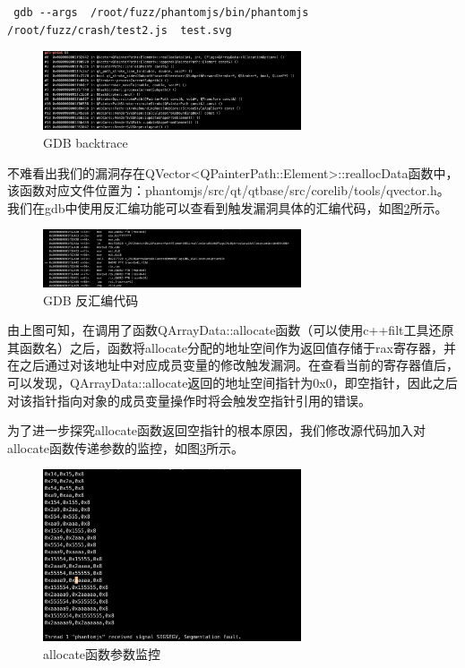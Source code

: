 \documentclass[doctor,privacy,twoside]{buaa_mac}
\begin{document}
\lstset{language=JavaScript}
\begin{lstlisting}
 gdb --args  /root/fuzz/phantomjs/bin/phantomjs /root/fuzz/crash/test2.js  test.svg 
 \end{lstlisting}
 
\centerline{}
\begin{figure}[!h]
  \centering
  \includegraphics[width=0.68\textwidth]{images/gdb_backtrace.png}
  \caption{GDB backtrace}
  \label{fig:logo}
\end{figure}

 
 不难看出我们的漏洞存在QVector<QPainterPath::Element>::reallocData函数中，该函数对应文件位置为：phantomjs/src/qt/qtbase/src/corelib/tools/qvector.h。 我们在gdb中使用反汇编功能可以查看到触发漏洞具体的汇编代码，如图\ref{fig:gdb}所示。
 
\centerline{}
\begin{figure}[!h]
  \centering
  \includegraphics[width=0.68\textwidth]{images/gdb_disassemble.png}
  \caption{GDB 反汇编代码}
  \label{fig:gdb}
\end{figure}

 
 由上图可知，在调用了函数QArrayData::allocate函数（可以使用c++filt工具还原其函数名）之后，函数将allocate分配的地址空间作为返回值存储于rax寄存器，并在之后通过对该地址中对应成员变量的修改触发漏洞。在查看当前的寄存器值后，可以发现，QArrayData::allocate返回的地址空间指针为0x0，即空指针，因此之后对该指针指向对象的成员变量操作时将会触发空指针引用的错误。
 
 为了进一步探究allocate函数返回空指针的根本原因，我们修改源代码加入对allocate函数传递参数的监控，如图\ref{fig:allocate}所示。
 
\centerline{}
\begin{figure}[!h]
  \centering
  \includegraphics[width=0.68\textwidth]{images/gdb_parameter.png}
  \caption{allocate函数参数监控}
  \label{fig:allocate}
\end{figure}
\end{document}
